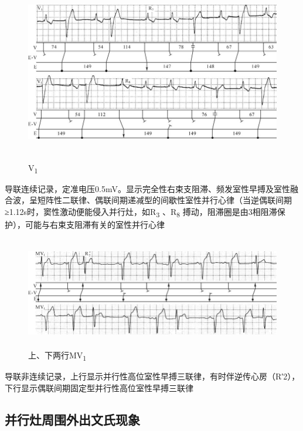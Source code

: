 \begin{figure}[!htbp]
 \centering
 \includegraphics[width=5.77083in,height=3.11458in]{./images/Image00293.jpg}
 \captionsetup{justification=centering}
 \caption{V\textsubscript{1}}
 \label{fig16-17}
  \end{figure} 
导联连续记录，定准电压0.5mV。显示完全性右束支阻滞、频发室性早搏及室性融合波，呈短阵性二联律、偶联间期递减型的间歇性室性并行心律（当逆偶联间期≥1.12s时，窦性激动便能侵入并行灶，如R\textsubscript{3}
、R\textsubscript{8}
搏动，阻滞圈是由3相阻滞保护），可能与右束支阻滞有关的室性并行心律

\begin{figure}[!htbp]
 \centering
 \includegraphics[width=5.73958in,height=1.92708in]{./images/Image00294.jpg}
 \captionsetup{justification=centering}
 \caption{上、下两行MV\textsubscript{1}}
 \label{fig16-18}
  \end{figure} 
导联非连续记录，上行显示并行性高位室性早搏三联律，有时伴逆传心房（R′2），下行显示偶联间期固定型并行性高位室性早搏三联律

\protect\hypertarget{text00023.htmlux5cux23subid293}{}{}

\subsection{并行灶周围外出文氏现象}

